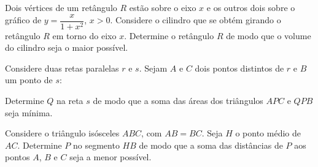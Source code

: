 \begin{exercicio}[30]
Dois vértices de um retângulo $R$ estão sobre o eixo $x$ e os outros dois sobre o gráfico de $y = \dfrac{x}{1 + x^2}$, $x > 0$. Considere o cilindro que se obtém girando o retângulo $R$ em torno do eixo $x$. Determine o retângulo $R$ de modo que o volume do cilindro seja o maior possível.
\end{exercicio}

\begin{exercicio}[31]
Considere duas retas paralelas $r$ e $s$. Sejam $A$ e $C$ dois pontos distintos de $r$ e $B$ um ponto de $s$:

\begin{center}
\end{center}

Determine $Q$ na reta $s$ de modo que a soma das áreas dos triângulos $APC$ e $QPB$ seja mínima.
\end{exercicio}

\begin{exercicio}[32]
Considere o triângulo isósceles $ABC$, com $AB = BC$. Seja $H$ o ponto médio de $AC$. Determine $P$ no segmento $HB$ de modo que a soma das distâncias de $P$ aos pontos $A$, $B$ e $C$ seja a menor possível.
\end{exercicio}

